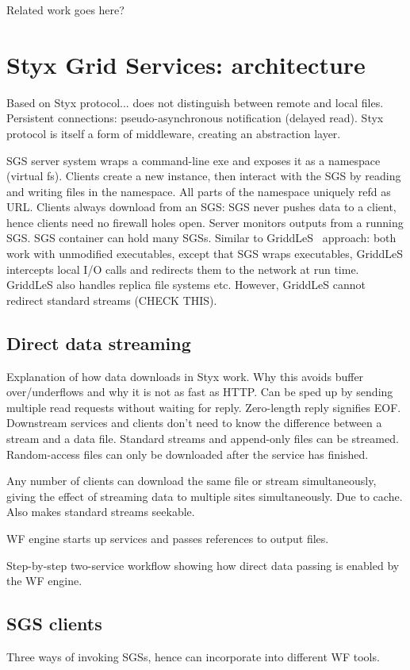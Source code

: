 \documentclass[a4paper]{article}
\begin{document}
Related work goes here?

\section{Styx Grid Services: architecture}

Based on Styx protocol...  does not distinguish between remote and local files.  Persistent connections: pseudo-asynchronous notification (delayed read).  Styx protocol is itself a form of middleware, creating an abstraction layer.

SGS server system wraps a command-line exe and exposes it as a namespace (virtual fs).  Clients create a new instance, then interact with the SGS by reading and writing files in the namespace.  All parts of the namespace uniquely refd as URL.  Clients always download from an SGS: SGS never pushes data to a client, hence clients need no firewall holes open.  Server monitors outputs from a running SGS.  SGS container can hold many SGSs.  Similar to GriddLeS~\cite{abramson:2004} approach: both work with unmodified executables, except that SGS wraps executables, GriddLeS intercepts local I/O calls and redirects them to the network at run time.  GriddLeS also handles replica file systems etc.  However, GriddLeS cannot redirect standard streams (CHECK THIS).

\subsection{Direct data streaming}
Explanation of how data downloads in Styx work.  Why this avoids buffer over/underflows and why it is not as fast as HTTP.  Can be sped up by sending multiple read requests without waiting for reply.  Zero-length reply signifies EOF.  Downstream services and clients don't need to know the difference between a stream and a data file.  Standard streams and append-only files can be streamed.  Random-access files can only be downloaded after the service has finished.

Any number of clients can download the same file or stream simultaneously, giving the effect of streaming data to multiple sites simultaneously.  Due to cache.  Also makes standard streams seekable.

WF engine starts up services and passes references to output files.

Step-by-step two-service workflow showing how direct data passing is enabled by the WF engine.

\subsection{SGS clients}
Three ways of invoking SGSs, hence can incorporate into different WF tools.
\end{document}
